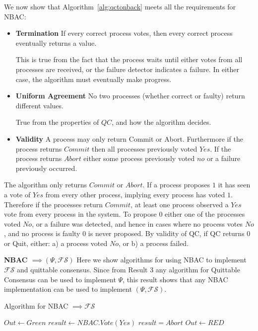 We now show that Algorithm~\ref{alg:qctonback} meets all the requirements for NBAC:
\begin{itemize}
\item \textbf{Termination} If every correct process votes, then every correct process eventually returns a value.

This is true from the fact that the process waits until either votes from all processes are received, or the failure
detector indicates a failure. In either case, the algorithm must eventually make progress.

\item \textbf{Uniform Agreement} No two processes (whether correct or faulty) return different values.

True from the properties of $QC$, and how the algorithm decides.

\item \textbf{Validity} A process may only return Commit or Abort. Furthermore if the process returns $Commit$ then all
processes previously voted $Yes$. If the process returns $Abort$ either some process previously voted $no$ or a failure
previously occurred.
\end{itemize}

The algorithm only returns $Commit$ or $Abort$. If a process proposes $1$ it has seen a vote of $Yes$ from every other
process, implying every process has voted $1$. Therefore if the processes return $Commit$, at least one process
observed a $Yes$ vote from every process in the system. To propose $0$ either one of the processes voted $No$, or a
failure was detected, and hence in cases where no process votes $No$, and no process is faulty $0$ is never proposed. By
validity of QC, if QC returns $0$ or Quit, either: a) a process voted $No$, or b) a process failed.

\textbf{NBAC $\implies (\Psi, \mathcal{FS})$} Here we show algorithms for using NBAC to implement $\mathcal{FS}$ and quittable
consensus. Since from Result 3 any algorithm for Quittable Consensus can be used to implement $\Psi$, this result shows
that any NBAC implementation can be used to implement $(\Psi, \mathcal{FS})$.

\begin{algorithm}
\caption{Algorithm for NBAC $\implies \mathcal{FS}$}
\label{alg:nbactofs}
\begin{algorithmic}[1]
    \State $Out \gets Green$ 
        \State $result \gets NBAC.Vote(Yes)$
        \If $result = Abort$
            \State $Out \gets RED$
        \EndIf
    \EndWhile
\EndProcedure
\end{algorithmic}
\end{algorithm}

